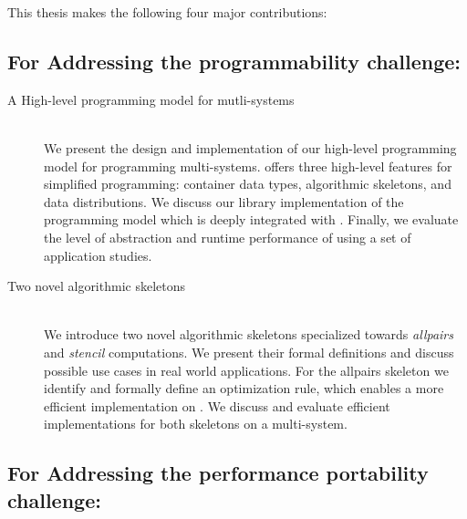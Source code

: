 This thesis makes the following four major contributions:

\subsection*{\hspace{2em}For Addressing the programmability challenge:}

\begin{description}
  \item[A High-level programming model for mutli-\GPU systems]\hfill\\[-1em]
    We present the design and implementation of our high-level programming model \SkelCL for programming multi-\GPU systems.
    \SkelCL offers three high-level features for simplified programming: container data types, algorithmic skeletons, and data distributions.
    We discuss our \Cpp library implementation of the \SkelCL programming model which is deeply integrated with \Cpp.
    Finally, we evaluate the level of abstraction and runtime performance of \SkelCL using a set of application studies.

  \item[Two novel algorithmic skeletons]\hfill\\[.25em]
    We introduce two novel algorithmic skeletons specialized towards \emph{allpairs} and \emph{stencil} computations.
    We present their formal definitions and discuss possible use cases in real world applications.
    For the allpairs skeleton we identify and formally define an optimization rule, which enables a more efficient implementation on \GPUs.
    We discuss and evaluate efficient implementations for both skeletons on a multi-\GPU system.
\end{description}

\subsection*{\hspace{2em}For Addressing the performance portability challenge:}

